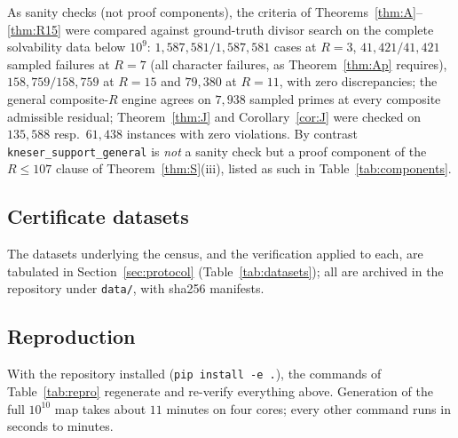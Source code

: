 \documentclass[11pt]{article}
\theoremstyle{plain}
\theoremstyle{remark}
\theoremstyle{plain}
\numberwithin{equation}{section}
\begin{document}
As sanity checks (not proof components), the criteria of
Theorems~\ref{thm:A}--\ref{thm:R15} were compared against
ground-truth divisor search on the complete solvability data below
$10^9$: $1{,}587{,}581/1{,}587{,}581$ cases at $R = 3$,
$41{,}421/41{,}421$ sampled failures at $R = 7$ (all character
failures, as Theorem~\ref{thm:Ap} requires),
$158{,}759/158{,}759$ at $R = 15$ and $79{,}380$ at $R = 11$, with
zero discrepancies; the general composite-$R$ engine agrees on
$7{,}938$ sampled primes at every composite admissible residual;
Theorem~\ref{thm:J} and Corollary~\ref{cor:J} were checked on
$135{,}588$ resp.\ $61{,}438$ instances with zero violations. By
contrast \texttt{kneser\_support\_general} is \emph{not} a sanity
check but a proof component of the $R \le 107$ clause of
Theorem~\ref{thm:S}(iii), listed as such in
Table~\ref{tab:components}.

\subsection{Certificate datasets}\label{app:datasets}

The datasets underlying the census, and the verification applied to
each, are tabulated in Section~\ref{sec:protocol}
(Table~\ref{tab:datasets}); all are archived in the repository under
\texttt{data/}, with sha256 manifests.

\subsection{Reproduction}\label{app:repro}

With the repository installed (\texttt{pip install -e .}), the
commands of Table~\ref{tab:repro} regenerate and re-verify everything
above. Generation of the
full $10^{10}$ map takes about $11$ minutes on four cores; every other
command runs in seconds to minutes.
\end{document}
